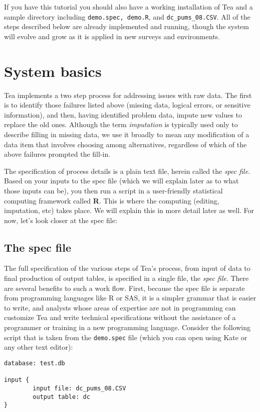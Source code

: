 \documentclass{article}
\begin{document}
If you have this tutorial you should also have a working installation of Tea and 
a sample directory including {\tt demo.spec, demo.R}, and {\tt dc\_pums\_08.CSV}. 
All of the steps described below are already implemented and running,
though the system will evolve and grow as it is applied in new surveys and environments.

\section{System basics}\label{basicssec}
Tea implements a two step process for addressing issues with raw data. The first is to
identify those failures listed above (missing data, logical errors, or sensitive
information), and then, having identified problem data, impute new values
to replace the old ones. Although the term {\em imputation} is typically used only to 
describe filling in missing data, we use it broadly to mean any modification of a 
data item that involves choosing among alternatives, regardless of which of the 
above failures prompted the fill-in. 

The specification of process details is a plain text file, herein called the {\em
spec file}. Based on your inputs to the spec file (which we will explain later as
to what those inputs can be), you then run a script in a user-friendly statistical
computing framework called {\bf R}. This is where the computing (editing, imputation,
etc) takes place. We will explain this in more detail later as well. For now, let's
look closer at the spec file:

\subsection{The spec file}\label{specsec}
The full specification of the various steps of Tea's process, from input of data to final
production of output tables, is specified in a single file, the {\em spec file}. There
are several benefits to such a work flow.  First, because the spec file is separate from
programming languages like R or SAS, it is a simpler grammar that is easier to
write, and analysts whose areas of expertise are not in programming can customize Tea
and write technical specifications without the assistance of a programmer or 
training in a new programming language. Consider the following script that is taken
from the {\tt demo.spec} file (which you can open using Kate or any other text editor):

\begin{verbatim}
database: test.db

input {
        input file: dc_pums_08.CSV
        output table: dc
}
\end{verbatim}
\end{document}
